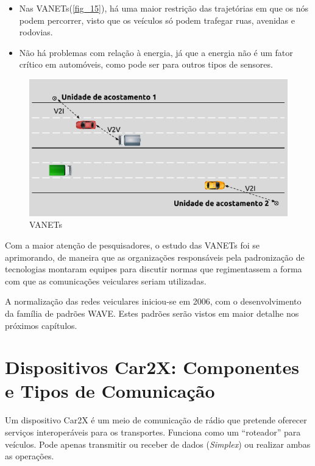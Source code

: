 \documentclass[
12pt,				%
openright,			%
oneside,			%
a4paper,			%
brazil,				%
]{abntex2}
\begin{document}
	\begin{itemize}
		\item Nas VANETs(\autoref{fig_15}), há uma maior restrição das trajetórias em que os nós podem percorrer, visto que os veículos só podem trafegar ruas, avenidas e rodovias.
		\item Não há problemas com relação à energia, já que a energia não é um fator crítico em automóveis, como pode ser para outros tipos de sensores.
	\end{itemize}
	
	\begin{figure} [H]
		\centering
		\includegraphics[scale=.7]{figuras/cap3/15VANETs}
		\caption{\label{fig_15}VANETs}
	\end{figure}
	
	\par Com a maior atenção de pesquisadores, o estudo das VANETs foi se aprimorando, de maneira que as organizações responsáveis pela padronização de tecnologias montaram equipes para discutir normas que regimentassem a forma com que as comunicações veiculares seriam utilizadas.
	
	\par A normalização das redes veiculares iniciou-se em 2006, com o desenvolvimento da família de padrões WAVE. Estes padrões serão vistos em maior detalhe nos próximos capítulos.
	
	\section{Dispositivos Car2X: Componentes e Tipos de Comunicação}
	
	\par Um dispositivo Car2X é um meio de comunicação de rádio que pretende oferecer serviços interoperáveis para os transportes. Funciona como um “roteador” para veículos. Pode apenas transmitir ou receber de dados (\textit{Simplex}) ou realizar ambas as operações.
	
\end{document}
